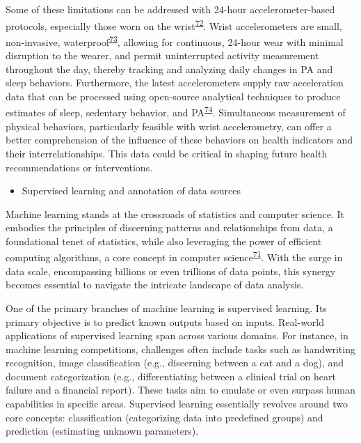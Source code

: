 \documentclass[
  9pt,
]{scrbook}
\providecommand{\tightlist}{%
  \setlength{\itemsep}{0pt}\setlength{\parskip}{0pt}}\usepackage{longtable,booktabs,array}
\begin{document}
Some of these limitations can be addressed with 24-hour
accelerometer-based protocols, especially those worn on the
wrist\textsuperscript{\protect\hyperlink{ref-rosenberger_24-hour_2019}{72}}.
Wrist accelerometers are small, non-invasive,
waterproof\textsuperscript{\protect\hyperlink{ref-welk_reliability_2004}{73}},
allowing for continuous, 24-hour wear with minimal disruption to the
wearer, and permit uninterrupted activity measurement throughout the
day, thereby tracking and analyzing daily changes in PA and sleep
behaviors. Furthermore, the latest accelerometers supply raw
acceleration data that can be processed using open-source analytical
techniques to produce estimates of sleep, sedentary behavior, and
PA\textsuperscript{\protect\hyperlink{ref-migueles_comparability_2019}{74}}.
Simultaneous measurement of physical behaviors, particularly feasible
with wrist accelerometry, can offer a better comprehension of the
influence of these behaviors on health indicators and their
interrelationships. This data could be critical in shaping future health
recommendations or interventions.

\begin{itemize}
\tightlist
\item
  Supervised learning and annotation of data sources
\end{itemize}

Machine learning stands at the crossroads of statistics and computer
science. It embodies the principles of discerning patterns and
relationships from data, a foundational tenet of statistics, while also
leveraging the power of efficient computing algorithms, a core concept
in computer
science\textsuperscript{\protect\hyperlink{ref-hastie01statisticallearning}{71}}.
With the surge in data scale, encompassing billions or even trillions of
data points, this synergy becomes essential to navigate the intricate
landscape of data analysis.

One of the primary branches of machine learning is supervised learning.
Its primary objective is to predict known outputs based on inputs.
Real-world applications of supervised learning span across various
domains. For instance, in machine learning competitions, challenges
often include tasks such as handwriting recognition, image
classification (e.g., discerning between a cat and a dog), and document
categorization (e.g., differentiating between a clinical trial on heart
failure and a financial report). These tasks aim to emulate or even
surpass human capabilities in specific areas. Supervised learning
essentially revolves around two core concepts: classification
(categorizing data into predefined groups) and prediction (estimating
unknown parameters).
\end{document}
